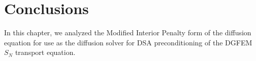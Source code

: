 \section{Conclusions}
\label{sec::DSA_Conclusions}

In this chapter, we analyzed the Modified Interior Penalty form of the diffusion equation for use as the diffusion solver for DSA preconditioning of the DGFEM $S_N$ transport equation.

